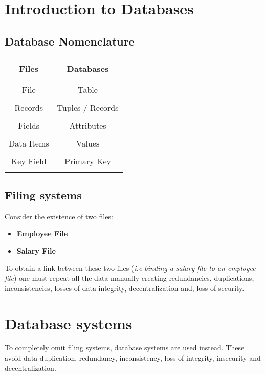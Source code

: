 \documentclass{article}
\begin{document}
	\section{Introduction to Databases}
	\subsection{Database Nomenclature}
	\begin{center}
			\begin{tabular}{|c|c|}
				\hline&\\
			\textbf{Files}     & \textbf{Databases}\\&\\ \hline&\\
				File       & Table            \\&\\
				Records    & Tuples / Records \\&\\
				Fields     & Attributes       \\&\\
				Data Items & Values           \\&\\
				Key Field  & Primary Key      \\&\\ \hline
			\end{tabular}
	\end{center}

	
	\subsection{Filing systems}
		Consider the existence of two files:
		\begin{itemize}
			\item{\textbf{Employee File}}
			\item\textbf{{Salary File}}
		\end{itemize}
	
		To obtain a link between these two files (\textit{i.e binding a salary file to an employee file}) one must repeat all the data manually creating redundancies, duplications, inconsistencies, losses of data integrity, decentralization and, loss of security.
		
	\section{Database systems}
		To completely omit filing systems, database systems are used instead. These avoid data duplication, redundancy, inconsistency, loss of integrity, insecurity and decentralization.\\
		
\end{document}
